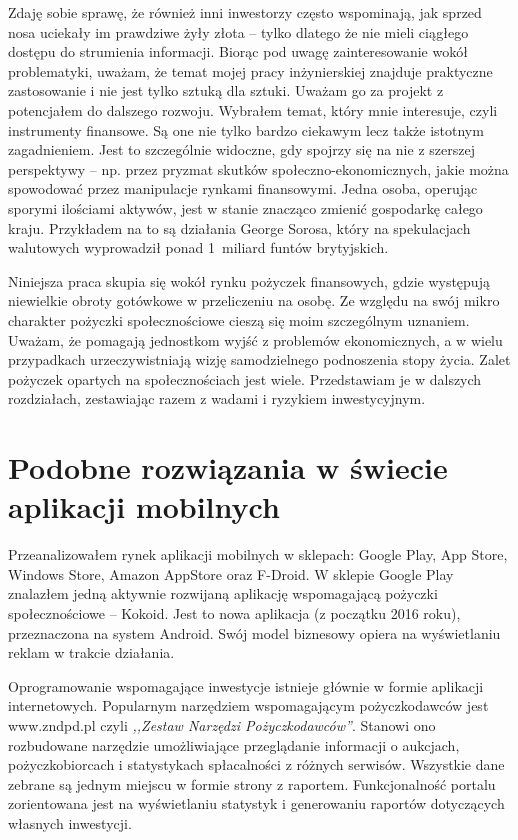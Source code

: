 \documentclass[a4paper,twoside,titlepage,openright]{book}
\begin{document}
Zdaję sobie sprawę, że również inni inwestorzy często wspominają, jak sprzed nosa uciekały im prawdziwe żyły złota -- tylko dlatego że nie mieli ciągłego dostępu do strumienia informacji. Biorąc pod uwagę zainteresowanie wokół problematyki, uważam, że temat mojej pracy inżynierskiej znajduje praktyczne zastosowanie i nie jest tylko sztuką dla sztuki. Uważam go za projekt z potencjałem do dalszego rozwoju. Wybrałem temat, który mnie interesuje, czyli instrumenty finansowe. Są one nie tylko bardzo ciekawym lecz także istotnym zagadnieniem. Jest to szczególnie widoczne, gdy spojrzy się na nie z szerszej perspektywy -- np. przez pryzmat skutków społeczno-ekonomicznych, jakie można spowodować przez manipulacje rynkami finansowymi. Jedna osoba, operując sporymi ilościami aktywów, jest w stanie znacząco zmienić gospodarkę całego kraju. Przykładem na to są działania George Sorosa, który na spekulacjach walutowych wyprowadził ponad 1~miliard funtów brytyjskich.\cite{soros}

Niniejsza praca skupia się wokół rynku pożyczek finansowych, gdzie występują niewielkie obroty gotówkowe w przeliczeniu na osobę. Ze względu na swój mikro charakter pożyczki społecznościowe cieszą się moim szczególnym uznaniem. Uważam, że pomagają jednostkom wyjść z problemów ekonomicznych, a w wielu przypadkach urzeczywistniają wizję samodzielnego podnoszenia stopy życia. Zalet pożyczek opartych na społecznościach jest wiele. Przedstawiam je w dalszych rozdziałach, zestawiając razem z wadami i ryzykiem inwestycyjnym.

\section*{Podobne rozwiązania w świecie aplikacji mobilnych}

Przeanalizowałem rynek aplikacji mobilnych w sklepach: Google Play, App Store, Windows Store, Amazon AppStore oraz F-Droid. W sklepie Google Play znalazłem jedną aktywnie rozwijaną aplikację wspomagającą pożyczki społecznościowe -- Kokoid. Jest to nowa aplikacja (z początku 2016 roku), przeznaczona na system Android. Swój model biznesowy opiera na wyświetlaniu reklam w trakcie działania.

Oprogramowanie wspomagające inwestycje istnieje głównie w formie aplikacji internetowych. Popularnym narzędziem wspomagającym pożyczkodawców jest www.zndpd.pl czyli \textit{,,Zestaw Narzędzi Pożyczkodawców''}. Stanowi ono rozbudowane narzędzie umożliwiające przeglądanie informacji o aukcjach, pożyczkobiorcach i statystykach spłacalności z różnych serwisów. Wszystkie dane zebrane są jednym miejscu w formie strony z raportem. Funkcjonalność portalu zorientowana jest na wyświetlaniu statystyk i generowaniu raportów dotyczących własnych inwestycji.
\end{document}
